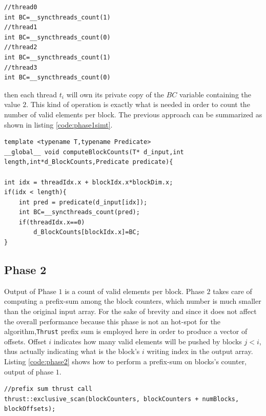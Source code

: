 \begin{lstlisting}
//thread0
int BC=__syncthreads_count(1)
//thread1
int BC=__syncthreads_count(0)
//thread2
int BC=__syncthreads_count(1)
//thread3
int BC=__syncthreads_count(0)
\end{lstlisting}
then each thread \(t_i\) will own its private copy of the \(BC\) variable containing the value $2$.
This kind of operation is exactly what is needed in order to count the number of valid elements per block.
The previous approach can be summarized as shown in listing \ref{code:phase1simt}.
\begin{lstlisting}
template <typename T,typename Predicate>
__global__ void computeBlockCounts(T* d_input,int length,int*d_BlockCounts,Predicate predicate){

int idx = threadIdx.x + blockIdx.x*blockDim.x;
if(idx < length){
	int pred = predicate(d_input[idx]);
	int BC=__syncthreads_count(pred);
	if(threadIdx.x==0)
		d_BlockCounts[blockIdx.x]=BC;
}
\end{lstlisting}

\subsection{Phase 2}
Output of Phase $1$ is a count of valid elements per block. 
Phase $2$ takes care of computing a prefix-sum among the block counters, which number is much smaller than the original input array.
For the sake of brevity and since it does not affect the overall performance because this phase is not an hot-spot for the algorithm,\texttt{Thrust} prefix sum is employed here in order to produce a vector of offsets. Offset $i$ indicates how many valid elements will be pushed by blocks $j < i$, thus actually indicating what is the block's $i$ writing index in the output array.
Listing \ref{code:phase2} shows how to perform a prefix-sum on blocks's counter, output of phase $1$.
\begin{lstlisting}
//prefix sum thrust call
thrust::exclusive_scan(blockCounters, blockCounters + numBlocks, blockOffsets);
\end{lstlisting}

